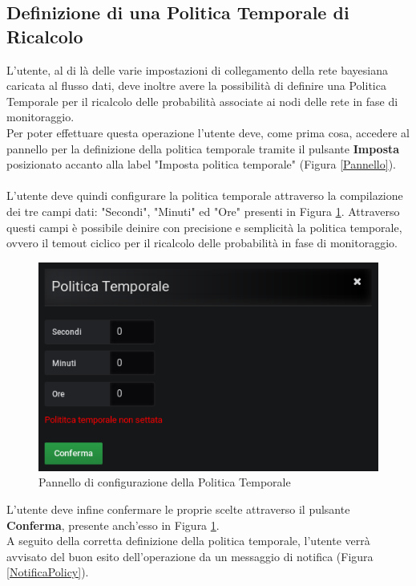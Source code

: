 \subsection{Definizione di una Politica Temporale di Ricalcolo}\label{policy}

L'utente, al di là delle varie impostazioni di collegamento della rete bayesiana caricata al flusso dati, deve inoltre avere la possibilità di definire una Politica Temporale per il ricalcolo delle probabilità associate ai nodi delle rete in fase di monitoraggio.\\
Per poter effettuare questa operazione l'utente deve, come prima cosa, accedere al pannello per la definizione della politica temporale tramite il pulsante \textbf{Imposta} posizionato accanto alla label "Imposta politica temporale" (Figura \ref{Pannello}).\\
~\\
L'utente deve quindi configurare la politica temporale attraverso la compilazione dei tre campi dati: "Secondi", "Minuti" ed "Ore" presenti in Figura \ref{PannelloPolicy}. Attraverso questi campi è possibile deinire con precisione e semplicità la politica temporale, ovvero il temout ciclico per il ricalcolo delle probabilità in fase di monitoraggio.

\begin{figure}[H]
	\begin{center}
		\includegraphics[scale=0.6]{./images/PannelloPolicy.png}
		 \caption{Pannello di configurazione della Politica Temporale}	
		 \label{PannelloPolicy}
	\end{center}
\end{figure} 

L'utente deve infine confermare le proprie scelte attraverso il pulsante \textbf{Conferma}, presente anch'esso in Figura \ref{PannelloPolicy}.
~\\
A seguito della corretta definizione della politica temporale, l'utente verrà avvisato del buon esito dell'operazione da un messaggio di notifica (Figura \ref{NotificaPolicy}). 

